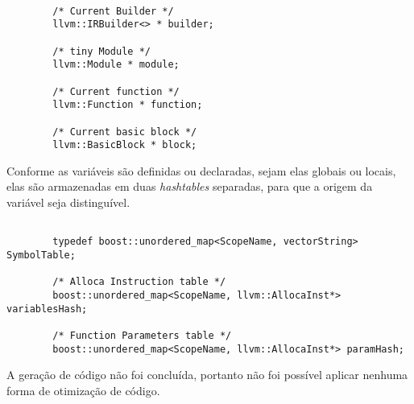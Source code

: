 \documentclass[12pt,a4paper,final]{article}
\begin{document}
\begin{lstlisting}

        /* Current Builder */
        llvm::IRBuilder<> * builder;

        /* tiny Module */
        llvm::Module * module;

        /* Current function */
        llvm::Function * function;

        /* Current basic block */
        llvm::BasicBlock * block;
\end{lstlisting}

Conforme as variáveis são definidas ou declaradas, sejam elas globais ou locais, elas são armazenadas em duas \textit{hashtables} separadas, para que a origem da variável seja distinguível.

\begin{lstlisting}

    	typedef boost::unordered_map<ScopeName, vectorString> SymbolTable;
      
        /* Alloca Instruction table */
        boost::unordered_map<ScopeName, llvm::AllocaInst*> variablesHash;

        /* Function Parameters table */
        boost::unordered_map<ScopeName, llvm::AllocaInst*> paramHash;
\end{lstlisting}

A geração de código não foi concluída, portanto não foi possível aplicar nenhuma forma de otimização de código.
\end{document}
